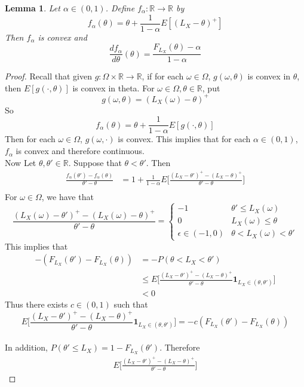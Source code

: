 \documentclass[12pt]{amsart}
\newtheorem{lem}[thm]{Lemma}
\newcommand{\al}{\alpha}
\newcommand{\ep}{\epsilon}
\newcommand{\om}{\omega}
\newcommand{\Om}{\Omega}
\newcommand{\R}{\mathbb{R}}
\begin{document}
\begin{lem}
Let $\al \in (0,1)$. Define $f_{\al}: \R \rightarrow \R$ by $$f_\al(\theta) = \theta + \frac{1}{1-\al}E[(L_X - \theta)^+]$$
Then $f_\al$ is convex and $$\frac{df_\al}{d \theta}(\theta) = \frac{F_{L_X}(\theta) - \al}{1-\al}$$
\end{lem}

\begin{proof} 
Recall that given $g:\Om \times \R \rightarrow \R$, if for each $\om \in \Om$, $g(\om, \theta)$ is convex in $\theta$, then $E[g(\cdot, \theta)]$ is convex in theta. For $\om \in \Om, \theta \in \R$, put $$g(\om, \theta) = (L_X(\om) - \theta)^+$$ So $$f_{\al}(\theta) = \theta + \frac{1}{1-\al}E[g(\cdot, \theta)]$$ Then for each $\om \in \Om$, $g(\om, \cdot)$ is convex. This implies that for each $\al\in (0,1)$, $f_{\al}$ is convex and therefore continuous. \vspace{3mm}\\ 
Now Let $\theta, \theta' \in \R$. Suppose that $\theta<\theta'$. Then 
\begin{align*}
\frac{f_\al(\theta') - f_\al(\theta)}{\theta' - \theta} 
&= 1 + \frac{1}{1-\al}E\bigg[\frac{(L_X - \theta')^+ - (L_X - \theta)^+}{\theta'-\theta}\bigg] \\
\end{align*}
For $\om \in \Om$, we have that 
$$\frac{(L_X(\om) - \theta')^+ - (L_X(\om) - \theta)^+}{\theta'-\theta}= 
\begin{cases}
-1 &  \theta' \leq L_X(\om) \\
0 & L_X(\om) \leq  \theta \\
\ep \in (-1,0) &\theta < L_X(\om) < \theta'
\end{cases}$$
This implies that 
\begin{align*}
-(F_{L_X}(\theta') - F_{L_X}(\theta))
&= -P(\theta < L_X < \theta') \\
&\leq E\bigg[ \frac{(L_X - \theta')^+ - (L_X - \theta)^+}{\theta'-\theta} \mathbf{1}_{L_X \in (\theta, \theta')}\bigg] \\
&< 0
\end{align*} 
Thus there exists $c \in (0, 1)$ such that $$E\bigg[ \frac{(L_X - \theta')^+ - (L_X - \theta)^+}{\theta'-\theta} \mathbf{1}_{L_X \in (\theta, \theta')}\bigg] = -c(F_{L_X}(\theta') - F_{L_X}(\theta))$$\vspace{3mm}\\
In addition, $P(\theta' \leq L_X) = 1-F_{L_X}(\theta')$.
Therefore 
\begin{align*}
E\bigg[ \frac{(L_X - \theta')^+ - (L_X - \theta)^+}{\theta'-\theta} \bigg]

\end{align*}
\end{proof}
\end{document}
